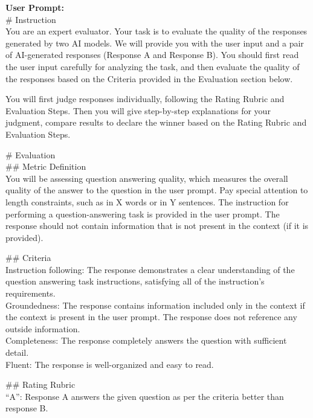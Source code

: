 \documentclass{article} %
\begin{document}
\begin{tcolorbox}[colback=gray!5!white, colframe=gray!60!black, title=Google Vertex Prompt, breakable]
\textbf{User Prompt:}\\
\# Instruction\\
You are an expert evaluator. Your task is to evaluate the quality of the responses generated by two AI models. We will provide you with the user input and a pair of AI-generated responses (Response A and Response B). You should first read the user input carefully for analyzing the task, and then evaluate the quality of the responses based on the Criteria provided in the Evaluation section below.\\\par
You will first judge responses individually, following the Rating Rubric and Evaluation Steps. Then you will give step-by-step explanations for your judgment, compare results to declare the winner based on the Rating Rubric and Evaluation Steps.\\\par
\# Evaluation\\
\#\# Metric Definition\\
You will be assessing question answering quality, which measures the overall quality of the answer to the question in the user prompt. Pay special attention to length constraints, such as in X words or in Y sentences. The instruction for performing a question-answering task is provided in the user prompt. The response should not contain information that is not present in the context (if it is provided).\\\par
\#\# Criteria\\
Instruction following: The response demonstrates a clear understanding of the question answering task instructions, satisfying all of the instruction's requirements.\\
Groundedness: The response contains information included only in the context if the context is present in the user prompt. The response does not reference any outside information.\\
Completeness: The response completely answers the question with sufficient detail.\\
Fluent: The response is well-organized and easy to read.\\\par
\#\# Rating Rubric\\
``A'': Response A answers the given question as per the criteria better than response B.\\

\end{tcolorbox}
\end{document}
